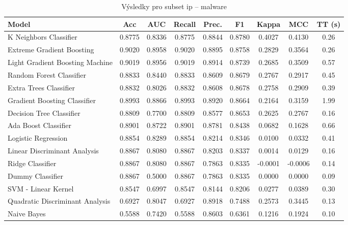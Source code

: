 \begin{table}[H]
  \centering
  \small
  \caption{Výsledky pro subset ip – malware}
  \begin{tabular}{|l|c|c|c|c|c|c|c|c|}
    \hline
    \textbf{Model} & \textbf{Acc} & \textbf{AUC} & \textbf{Recall} & \textbf{Prec.} & \textbf{F1} & \textbf{Kappa} & \textbf{MCC} & \textbf{TT (s)} \\
    \hline
    K Neighbors Classifier & 0.8775 & 0.8336 & 0.8775 & 0.8844 & 0.8780 & 0.4027 & 0.4130 & 0.26 \\
    Extreme Gradient Boosting & 0.9020 & 0.8958 & 0.9020 & 0.8895 & 0.8758 & 0.2829 & 0.3564 & 0.26 \\
    Light Gradient Boosting Machine & 0.9019 & 0.8956 & 0.9019 & 0.8914 & 0.8739 & 0.2685 & 0.3509 & 0.57 \\
    Random Forest Classifier & 0.8833 & 0.8440 & 0.8833 & 0.8609 & 0.8679 & 0.2767 & 0.2917 & 0.45 \\
    Extra Trees Classifier & 0.8832 & 0.8026 & 0.8832 & 0.8608 & 0.8678 & 0.2758 & 0.2909 & 0.39 \\
    Gradient Boosting Classifier & 0.8993 & 0.8866 & 0.8993 & 0.8920 & 0.8664 & 0.2164 & 0.3159 & 1.99 \\
    Decision Tree Classifier & 0.8809 & 0.7700 & 0.8809 & 0.8577 & 0.8653 & 0.2625 & 0.2767 & 0.16 \\
    Ada Boost Classifier & 0.8901 & 0.8722 & 0.8901 & 0.8781 & 0.8438 & 0.0682 & 0.1628 & 0.66 \\
    Logistic Regression & 0.8854 & 0.8289 & 0.8854 & 0.8214 & 0.8346 & 0.0100 & 0.0332 & 0.41 \\
    Linear Discriminant Analysis & 0.8867 & 0.8080 & 0.8867 & 0.8203 & 0.8337 & 0.0014 & 0.0129 & 0.16 \\
    Ridge Classifier & 0.8867 & 0.8080 & 0.8867 & 0.7863 & 0.8335 & -0.0001 & -0.0006 & 0.14 \\
    Dummy Classifier & 0.8867 & 0.5000 & 0.8867 & 0.7863 & 0.8335 & 0.0000 & 0.0000 & 0.09 \\
    SVM - Linear Kernel & 0.8547 & 0.6997 & 0.8547 & 0.8144 & 0.8206 & 0.0277 & 0.0389 & 0.30 \\
    Quadratic Discriminant Analysis & 0.6927 & 0.8047 & 0.6927 & 0.8918 & 0.7488 & 0.2573 & 0.3445 & 0.13 \\
    Naive Bayes & 0.5588 & 0.7420 & 0.5588 & 0.8603 & 0.6361 & 0.1216 & 0.1924 & 0.10 \\
    \hline
  \end{tabular}
\end{table}
\vspace{0.5cm}

